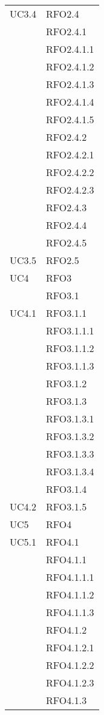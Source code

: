 \begin{center}
\begin{longtable}{ | >{\centering\arraybackslash}m{5cm} | >{\centering\arraybackslash}m{5cm} | }
        UC3.4 & RFO2.4\\
            & RFO2.4.1 \\
            & RFO2.4.1.1 \\
            & RFO2.4.1.2 \\
            & RFO2.4.1.3 \\
            & RFO2.4.1.4 \\
            & RFO2.4.1.5 \\
            & RFO2.4.2 \\
            & RFO2.4.2.1 \\
            & RFO2.4.2.2 \\
            & RFO2.4.2.3 \\
            & RFO2.4.3 \\
            & RFO2.4.4 \\
            & RFO2.4.5 \\
\hline

        UC3.5 & RFO2.5\\
\hline

        UC4 & RFO3\\
            & RFO3.1 \\
\hline

        UC4.1 & RFO3.1.1\\
            & RFO3.1.1.1 \\
            & RFO3.1.1.2 \\
            & RFO3.1.1.3 \\
            & RFO3.1.2 \\
            & RFO3.1.3 \\
            & RFO3.1.3.1 \\
            & RFO3.1.3.2 \\
            & RFO3.1.3.3 \\
            & RFO3.1.3.4 \\
            & RFO3.1.4 \\
\hline

        UC4.2 & RFO3.1.5\\
\hline

        UC5 & RFO4\\
\hline

        UC5.1 & RFO4.1\\
            & RFO4.1.1 \\
            & RFO4.1.1.1 \\
            & RFO4.1.1.2 \\
            & RFO4.1.1.3 \\
            & RFO4.1.2 \\
            & RFO4.1.2.1 \\
            & RFO4.1.2.2 \\
            & RFO4.1.2.3 \\
            & RFO4.1.3 \\
\hline


\end{longtable}
\end{center}
